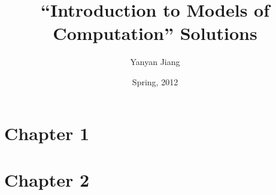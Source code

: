 \documentclass[11pt]{article}
\begin{document}
\newtheorem{thm}{定理}
\newtheorem{deff}[thm]{定义}
\newtheorem*{pf}{Proof}
\newtheorem{lem}[thm]{引理}

\title{\hei \bf ``Introduction to Models of Computation'' Solutions}
\author {Yanyan Jiang}
\date{\kai Spring, 2012}

\maketitle

\section{Chapter 1}



























\section{Chapter 2}

\newpage
\end{document}
